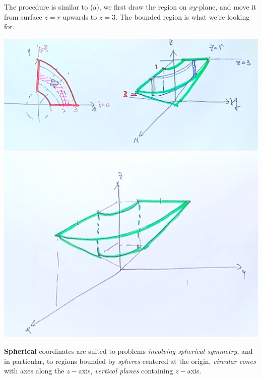 \begin{spacing}{1.3}
    The procedure is similar to (a), we first draw the region on $xy$-plane, and 
    move it from surface $z=r$ upwards to $z=3$. The bounded region is what we're looking for.
    \begin{center}
        \includegraphics[scale=0.16]{images/Ch14-int-cylind-eg3-1.JPG}
        \includegraphics[scale=0.1]{images/Ch14-int-cylind-eg3-2.JPG}
    \end{center}
    

    \newpage
    {\bf Spherical} coordinates are suited to problems {\it involving spherical symmetry}, 
    and in particular, to regions bounded by {\it spheres} centered at the origin, {\it circular 
    cones} with axes along the $z-$axis, {\it vertical planes} containing $z-$axis.


\end{spacing}

